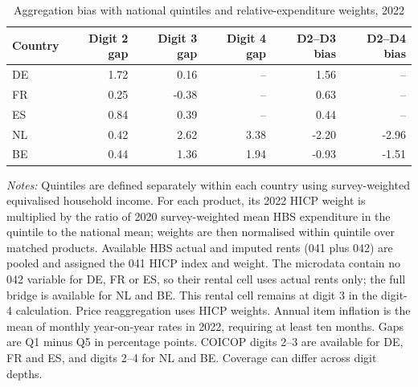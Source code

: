 \begin{table}[!htbp]

\caption{\label{tab:aggregation-bias-rent-bridge-2022}Aggregation bias with national quintiles and relative-expenditure weights, 2022}
\centering
\begin{tabular}[t]{lrrrrr}
\toprule
Country & Digit 2 gap & Digit 3 gap & Digit 4 gap & D2--D3 bias & D2--D4 bias\\
\midrule
DE & 1.72 & 0.16 & -- & 1.56 & --\\
FR & 0.25 & -0.38 & -- & 0.63 & --\\
ES & 0.84 & 0.39 & -- & 0.44 & --\\
NL & 0.42 & 2.62 & 3.38 & -2.20 & -2.96\\
BE & 0.44 & 1.36 & 1.94 & -0.93 & -1.51\\
\bottomrule
\end{tabular}

\begin{flushleft}
\footnotesize{\emph{Notes:} Quintiles are defined separately within each country using survey-weighted equivalised household income. For each product, its 2022 HICP weight is multiplied by the ratio of 2020 survey-weighted mean HBS expenditure in the quintile to the national mean; weights are then normalised within quintile over matched products. Available HBS actual and imputed rents (041 plus 042) are pooled and assigned the 041 HICP index and weight. The microdata contain no 042 variable for DE, FR or ES, so their rental cell uses actual rents only; the full bridge is available for NL and BE. This rental cell remains at digit 3 in the digit-4 calculation. Price reaggregation uses HICP weights. Annual item inflation is the mean of monthly year-on-year rates in 2022, requiring at least ten months. Gaps are Q1 minus Q5 in percentage points. COICOP digits 2--3 are available for DE, FR and ES, and digits 2--4 for NL and BE. Coverage can differ across digit depths.}
\end{flushleft}
\end{table}
